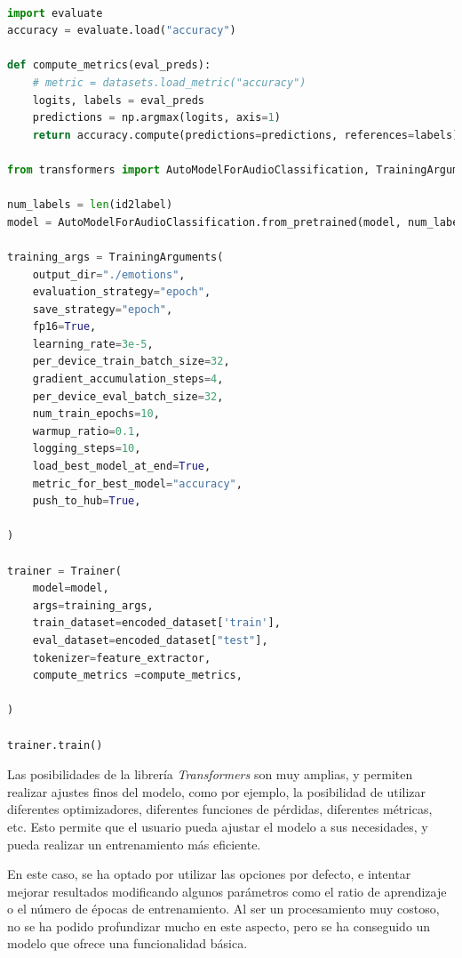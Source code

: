 \begin{lstlisting}[language=Python, caption=Entrenamiento del modelo, label={code:train-model}]

import evaluate
accuracy = evaluate.load("accuracy")

def compute_metrics(eval_preds):
    # metric = datasets.load_metric("accuracy")
    logits, labels = eval_preds
    predictions = np.argmax(logits, axis=1)
    return accuracy.compute(predictions=predictions, references=labels)

from transformers import AutoModelForAudioClassification, TrainingArguments, Trainer

num_labels = len(id2label)
model = AutoModelForAudioClassification.from_pretrained(model, num_labels=num_labels, label2id=label2id, id2label=id2label)

training_args = TrainingArguments(
    output_dir="./emotions",
    evaluation_strategy="epoch",
    save_strategy="epoch",
    fp16=True,
    learning_rate=3e-5,
    per_device_train_batch_size=32,
    gradient_accumulation_steps=4,
    per_device_eval_batch_size=32,
    num_train_epochs=10,
    warmup_ratio=0.1,
    logging_steps=10,
    load_best_model_at_end=True,
    metric_for_best_model="accuracy",
    push_to_hub=True,

)

trainer = Trainer(
    model=model,
    args=training_args,
    train_dataset=encoded_dataset['train'],
    eval_dataset=encoded_dataset["test"],
    tokenizer=feature_extractor,
    compute_metrics =compute_metrics,

)

trainer.train()

\end{lstlisting}


Las posibilidades de la librería \textit{Transformers} son muy amplias, y permiten realizar ajustes finos del modelo, como por ejemplo, la posibilidad de utilizar diferentes optimizadores, diferentes funciones de pérdidas, diferentes métricas, etc.
Esto permite que el usuario pueda ajustar el modelo a sus necesidades, y pueda realizar un entrenamiento más eficiente.

En este caso, se ha optado por utilizar las opciones por defecto, e intentar mejorar resultados modificando algunos parámetros como el ratio de aprendizaje o el número de épocas de entrenamiento.
Al ser un procesamiento muy costoso, no se ha podido profundizar mucho en este aspecto, pero se ha conseguido un modelo que ofrece una funcionalidad básica.

